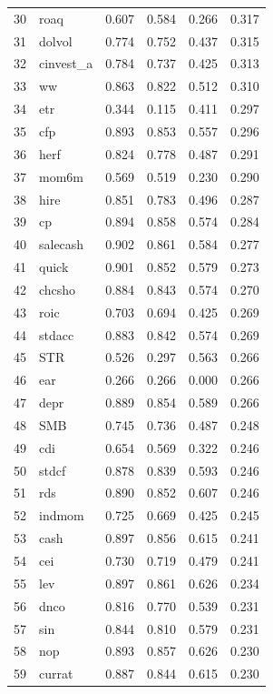 \documentclass[12pt]{article}
\begin{document}
\begin{footnotesize}
\begin{longtable}{rl|c|c|c|c}
		30 & roaq & 0.607 & 0.584 & 0.266 & 0.317 \\ 
		31 & dolvol & 0.774 & 0.752 & 0.437 & 0.315 \\ 
		32 & cinvest\_a & 0.784 & 0.737 & 0.425 & 0.313 \\ 
		33 & ww & 0.863 & 0.822 & 0.512 & 0.310 \\ 
		34 & etr & 0.344 & 0.115 & 0.411 & 0.297 \\ 
		35 & cfp & 0.893 & 0.853 & 0.557 & 0.296 \\ 
		36 & herf & 0.824 & 0.778 & 0.487 & 0.291 \\ 
		37 & mom6m & 0.569 & 0.519 & 0.230 & 0.290 \\ 
		38 & hire & 0.851 & 0.783 & 0.496 & 0.287 \\ 
		39 & cp & 0.894 & 0.858 & 0.574 & 0.284 \\ 
		40 & salecash & 0.902 & 0.861 & 0.584 & 0.277 \\ 
		41 & quick & 0.901 & 0.852 & 0.579 & 0.273 \\ 
		42 & chcsho & 0.884 & 0.843 & 0.574 & 0.270 \\ 
		43 & roic & 0.703 & 0.694 & 0.425 & 0.269 \\ 
		44 & stdacc & 0.883 & 0.842 & 0.574 & 0.269 \\ 
		45 & STR & 0.526 & 0.297 & 0.563 & 0.266 \\ 
		46 & ear & 0.266 & 0.266 & 0.000 & 0.266 \\ 
		47 & depr & 0.889 & 0.854 & 0.589 & 0.266 \\ 
		48 & SMB & 0.745 & 0.736 & 0.487 & 0.248 \\ 
		49 & cdi & 0.654 & 0.569 & 0.322 & 0.246 \\ 
		50 & stdcf & 0.878 & 0.839 & 0.593 & 0.246 \\ 
		51 & rds & 0.890 & 0.852 & 0.607 & 0.246 \\ 
		52 & indmom & 0.725 & 0.669 & 0.425 & 0.245 \\ 
		53 & cash & 0.897 & 0.856 & 0.615 & 0.241 \\ 
		54 & cei & 0.730 & 0.719 & 0.479 & 0.241 \\ 
		55 & lev & 0.897 & 0.861 & 0.626 & 0.234 \\ 
		56 & dnco & 0.816 & 0.770 & 0.539 & 0.231 \\ 
		57 & sin & 0.844 & 0.810 & 0.579 & 0.231 \\ 
		58 & nop & 0.893 & 0.857 & 0.626 & 0.230 \\ 
		59 & currat & 0.887 & 0.844 & 0.615 & 0.230 \\ 

\end{longtable}
\end{footnotesize}
\end{document}
